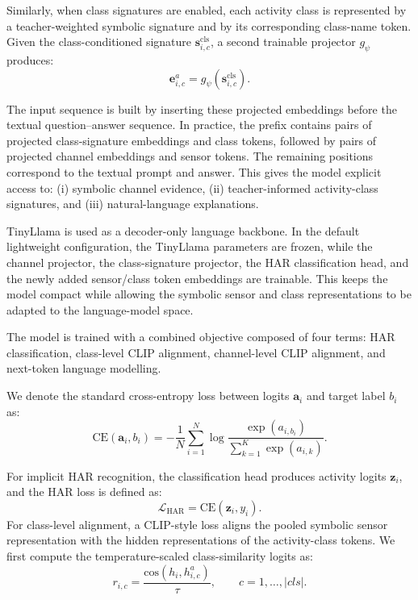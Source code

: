 \documentclass[preprint,12pt]{elsarticle}
\begin{document}
Similarly, when class signatures are enabled, each activity class is represented by a teacher-weighted symbolic signature and by its corresponding class-name token. Given the class-conditioned signature $\mathbf{s}_{i,c}^{\mathrm{cls}}$, a second trainable projector $g_{\psi}$ produces:
\[
\mathbf{e}_{i,c}^{a} = g_{\psi}(\mathbf{s}_{i,c}^{\mathrm{cls}}).
\]

The input sequence is built by inserting these projected embeddings before the textual question--answer sequence. In practice, the prefix contains pairs of projected class-signature embeddings and class tokens, followed by pairs of projected channel embeddings and sensor tokens. The remaining positions correspond to the textual prompt and answer. This gives the model explicit access to: (i) symbolic channel evidence, (ii) teacher-informed activity-class signatures, and (iii) natural-language explanations.

TinyLlama is used as a decoder-only language backbone. In the default lightweight configuration, the TinyLlama parameters are frozen, while the channel projector, the class-signature projector, the HAR classification head, and the newly added sensor/class token embeddings are trainable. This keeps the model compact while allowing the symbolic sensor and class representations to be adapted to the language-model space.

The model is trained with a combined objective composed of four terms: HAR classification, class-level CLIP alignment, channel-level CLIP alignment, and next-token language modelling.

We denote the standard cross-entropy loss between logits $\mathbf{a}_i$ and target label $b_i$ as:
\begin{equation}
\mathrm{CE}(\mathbf{a}_i,b_i)
=
- \frac{1}{N} \sum_{i=1}^{N}
\log
\frac{\exp(a_{i,b_i})}{\sum_{k=1}^{K} \exp(a_{i,k})}.
\end{equation}

For implicit HAR recognition, the classification head produces activity logits $\mathbf{z}_i$, and the HAR loss is defined as:
\begin{equation}
\mathcal{L}_{\text{HAR}}
=
\mathrm{CE}(\mathbf{z}_i, y_i).
\end{equation}
For class-level alignment, a CLIP-style loss aligns the pooled symbolic sensor representation with the hidden representations of the activity-class tokens. We first compute the temperature-scaled class-similarity logits as:
\[
r_{i,c}
=
\frac{
\mathrm{cos}
\left(
{h}_i,
{h}_{i,c}^{a}
\right)
}{\tau},
\qquad c = 1,\ldots,|cls|.
\]
\end{document}
